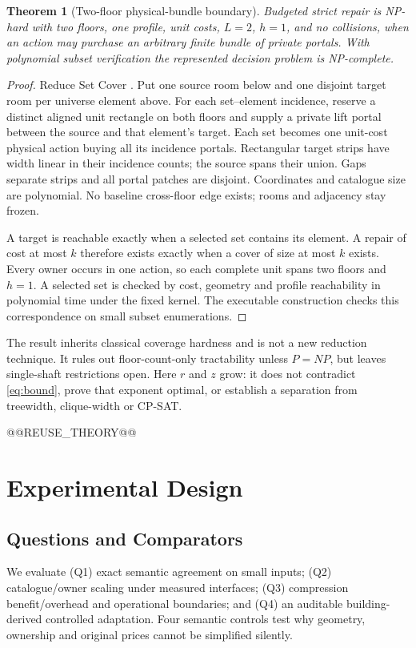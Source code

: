 \documentclass[conference]{IEEEtran}
\newtheorem{theorem}{Theorem}
\begin{document}
\begin{theorem}[Two-floor physical-bundle boundary]\label{thm:hardness}
Budgeted strict repair is NP-hard with two floors, one profile, unit costs, $L=2$, $h=1$, and no collisions, when an action may purchase an arbitrary finite bundle of private portals. With polynomial subset verification the represented decision problem is NP-complete.
\end{theorem}
\begin{proof}
Reduce Set Cover \cite{karp}. Put one source room below and one disjoint target room per universe element above. For each set--element incidence, reserve a distinct aligned unit rectangle on both floors and supply a private lift portal between the source and that element's target. Each set becomes one unit-cost physical action buying all its incidence portals. Rectangular target strips have width linear in their incidence counts; the source spans their union. Gaps separate strips and all portal patches are disjoint. Coordinates and catalogue size are polynomial. No baseline cross-floor edge exists; rooms and adjacency stay frozen.

A target is reachable exactly when a selected set contains its element. A repair of cost at most $k$ therefore exists exactly when a cover of size at most $k$ exists. Every owner occurs in one action, so each complete unit spans two floors and $h=1$. A selected set is checked by cost, geometry and profile reachability in polynomial time under the fixed kernel. The executable construction checks this correspondence on small subset enumerations.
\end{proof}
The result inherits classical coverage hardness and is not a new reduction technique. It rules out floor-count-only tractability unless $P=NP$, but leaves single-shaft restrictions open. Here $r$ and $z$ grow: it does not contradict \eqref{eq:bound}, prove that exponent optimal, or establish a separation from treewidth, clique-width or CP-SAT.

@@REUSE_THEORY@@

\section{Experimental Design}
\subsection{Questions and Comparators}
We evaluate (Q1) exact semantic agreement on small inputs; (Q2) catalogue/owner scaling under measured interfaces; (Q3) compression benefit/overhead and operational boundaries; and (Q4) an auditable building-derived controlled adaptation. Four semantic controls test why geometry, ownership and original prices cannot be simplified silently.
\end{document}
